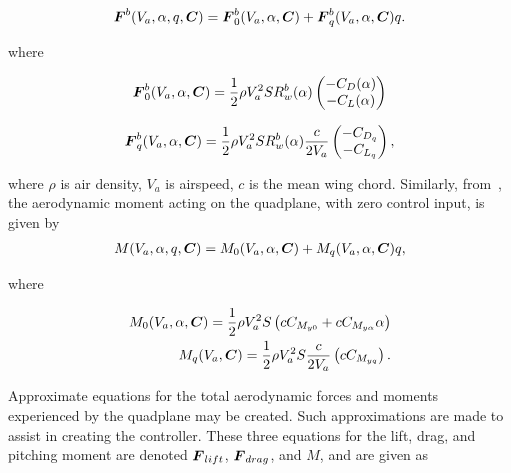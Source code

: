 \begin{align}
    \boldsymbol{F}^b(V_a, \alpha, q, \boldsymbol{C}) 
    = \boldsymbol{F}_0^b(V_a, \alpha, \boldsymbol{C}) 
    + \boldsymbol{F}_q^b(V_a, \alpha, \boldsymbol{C}) q
    .
\end{align}

where

\begin{align}
    \boldsymbol{F}_0^b(V_a, \alpha, \boldsymbol{C}) 
        = \frac{1}{2}\rho V_a^2 S 
            R_w^b(\alpha)
            \begin{pmatrix}
                -C_D(\alpha) \\
                -C_L(\alpha)
            \end{pmatrix}
    \label{eq:F_0}\\
\end{align}

\begin{align}
    \boldsymbol{F}_q^b(V_a, \alpha, \boldsymbol{C})
        =  \frac{1}{2}\rho V_a^2 S
            R_w^b(\alpha)\frac{c}{2V_a}
            \begin{pmatrix}
                -C_{D_q} \\
                -C_{L_q}
            \end{pmatrix},
    \label{eq:F_q}
\end{align}

where $\rho$ is air density, $V_a$ is airspeed, $c$ is the mean wing chord. 
Similarly, from~\cite{uav_book}, the aerodynamic moment acting on the quadplane, with zero control input, is given by
\begin{align}
    M(V_a, \alpha, q, \boldsymbol{C}) 
        = M_0(V_a, \alpha, \boldsymbol{C}) 
        + M_q(V_a, \alpha, \boldsymbol{C}) q,
\end{align}

where

\begin{align*}
    M_0(V_a, \alpha, \boldsymbol{C}) 
        =  \frac{1}{2}\rho V_a^2 S 
            \left(
                cC_{M_{y0}} + cC_{M_{y\alpha}}\alpha
            \right) \\
    M_q(V_a, \boldsymbol{C})
        =  \frac{1}{2}\rho V_a^2 S \frac{c}{2V_a}
            \left(
                cC_{M_{yq}}
            \right).
\end{align*}

Approximate equations for the total aerodynamic forces and moments experienced by the quadplane may be created.
Such approximations are made to assist in creating the controller.
These three equations for the lift, drag, and pitching moment are denoted $\boldsymbol{F}_{lift}$, $\boldsymbol{F}_{drag}$, and $M$, and are given as

